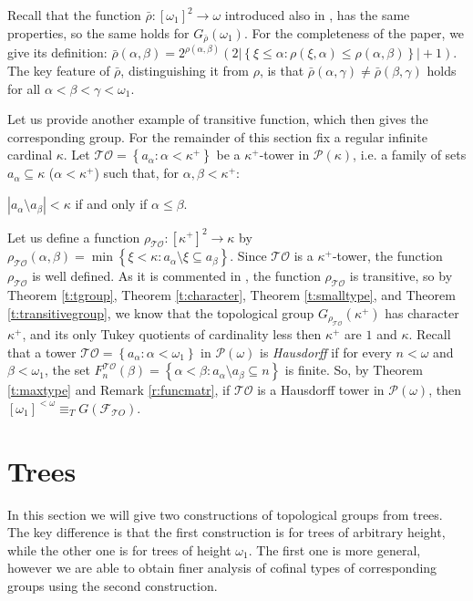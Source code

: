 \documentclass{amsart}
\theoremstyle{plain}
\theoremstyle{definition}
\numberwithin{equation}{section}
\renewcommand{\a}{\alpha}
\renewcommand{\b}{\beta}
\newcommand{\g}{\gamma}
\renewcommand{\k}{\kappa}
\renewcommand{\o}{\omega}
\newcommand{\sst}{\subseteq}
\newcommand{\set}[1]{\left\{#1\right\}}
\newcommand{\abs}[1]{\left\vert#1\right\vert}
\begin{document}
Recall that the function $\bar\rho:[\o_1]^2\to\o$ introduced also in \cite[Section 3]{walks}, has the same properties, so the same holds for $G_{\bar\rho}(\o_1)$.
For the completeness of the paper, we give its definition: $\bar\rho(\a,\b)=2^{\rho(\a,\b)}(2\abs{\set{\xi\le\a:\rho(\xi,\a)\le\rho(\a,\b)}}+1)$.
The key feature of $\bar\rho$, distinguishing it from $\rho$, is that $\bar\rho(\a,\g)\neq\bar\rho(\b,\g)$ holds for all $\a<\b<\g<\o_1$.

Let us provide another example of transitive function, which then gives the corresponding group.
For the remainder of this section fix a regular infinite cardinal $\k$.
Let $\mathcal{TO}=\set{a_{\a}: \a < \kappa^+}$ be a $\k^+$-tower in $\mathcal{P}(\k)$, i.e. a family of sets $a_{\a} \sst \k$ ($\a<\k^+$) such that, for $\a,\b<\k^+$:

\begin{center}
	$\abs{a_{\a}\setminus a_{\b}}<\k$ if and only if $\a \le \b$.
\end{center}
Let us define a function $\rho_{\mathcal{TO}}:[\k^+]^2\to \k$ by $\rho_{\mathcal{TO}}(\a,\b)=\min\set{\xi<\k:a_{\a}\setminus \xi\sst a_{\b}}$.
Since $\mathcal{TO}$ is a $\k^+$-tower, the function $\rho_{\mathcal{TO}}$ is well defined.
As it is commented in \cite[pp. 64]{walks}, the function $\rho_{\mathcal{TO}}$ is transitive, so by Theorem \ref{t:tgroup}, Theorem \ref{t:character}, Theorem \ref{t:smalltype}, and Theorem \ref{t:transitivegroup}, we know that the topological group $G_{\rho_{\mathcal{TO}}}(\k^+)$ has character $\k^+$, and its only Tukey quotients of cardinality less then $\k^+$ are $1$ and $\k$.
Recall that a tower $\mathcal{TO}=\set{a_{\a}:\a<\o_1}$ in $\mathcal P(\o)$ is \emph{Hausdorff} if for every $n<\o$ and $\b<\o_1$, the set $F^{\mathcal{TO}}_n(\b)=\set{\a<\b:a_{\a}\setminus a_{\b}\sst n}$ is finite.
So, by Theorem \ref{t:maxtype} and Remark \ref{r:funcmatr}, if $\mathcal{TO}$ is a Hausdorff tower in $\mathcal{P}(\o)$, then $[\o_1]^{<\o}\equiv_T G(\mathcal F_{\mathcal TO})$.


\section{Trees}\label{s:tree}

In this section we will give two constructions of topological groups from trees.
The key difference is that the first construction is for trees of arbitrary height, while the other one is for trees of height $\o_1$.
The first one is more general, however we are able to obtain finer analysis of cofinal types of corresponding groups using the second construction.
\end{document}
